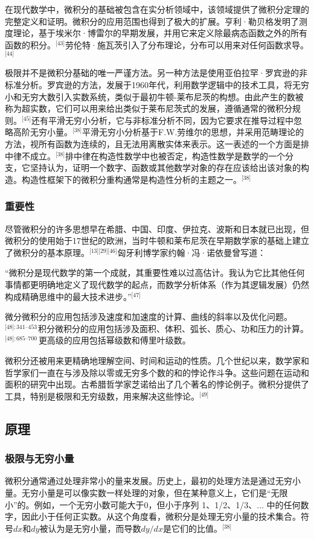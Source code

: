在现代数学中，微积分的基础被包含在实分析领域中，该领域提供了微积分定理的完整定义和证明。微积分的应用范围也得到了极大的扩展。亨利·勒贝格发明了测度理论，基于埃米尔·博雷尔的早期发展，并用它来定义除最病态函数之外的所有函数的积分。\(^\text{[43]}\)劳伦特·施瓦茨引入了分布理论，分布可以用来对任何函数求导。\(^\text{[44]}\)

极限并不是微积分基础的唯一严谨方法。另一种方法是使用亚伯拉罕·罗宾逊的非标准分析。罗宾逊的方法，发展于1960年代，利用数学逻辑中的技术工具，将无穷小和无穷大数引入实数系统，类似于最初牛顿-莱布尼茨的构想。由此产生的数被称为超实数，它们可以用来给出类似于莱布尼茨式的发展，遵循通常的微积分规则。\(^\text{[45]}\)还有平滑无穷小分析，它与非标准分析不同，因为它要求在推导过程中忽略高阶无穷小量。\(^\text{[38]}\)平滑无穷小分析基于F.W.劳维尔的思想，并采用范畴理论的方法，视所有函数为连续的，且无法用离散实体来表示。这一表述的一个方面是排中律不成立。\(^\text{[38]}\)排中律在构造性数学中也被否定，构造性数学是数学的一个分支，它坚持认为，证明一个数字、函数或其他数学对象的存在应该给出该对象的构造。构造性框架下的微积分重构通常是构造性分析的主题之一。\(^\text{[38]}\)
\subsubsection{重要性} 
尽管微积分的许多思想早在希腊、中国、印度、伊拉克、波斯和日本就已出现，但微积分的使用始于17世纪的欧洲，当时牛顿和莱布尼茨在早期数学家的基础上建立了微积分的基本原理。\(^\text{[13][29][46]}\)匈牙利博学家约翰·冯·诺依曼曾写道：

“微积分是现代数学的第一个成就，其重要性难以过高估计。我认为它比其他任何事情都更明确地定义了现代数学的起点，而数学分析体系（作为其逻辑发展）仍然构成精确思维中的最大技术进步。”\(^\text{[47]}\)

微分微积分的应用包括涉及速度和加速度的计算、曲线的斜率以及优化问题。\(^\text{[48]: 341–453}\) 积分微积分的应用包括涉及面积、体积、弧长、质心、功和压力的计算。\(^\text{[48]: 685–700 }\) 更高级的应用包括幂级数和傅里叶级数。

微积分还被用来更精确地理解空间、时间和运动的性质。几个世纪以来，数学家和哲学家们一直在与涉及除以零或无穷多个数的和的悖论作斗争。这些问题在运动和面积的研究中出现。古希腊哲学家芝诺给出了几个著名的悖论例子。微积分提供了工具，特别是极限和无穷级数，用来解决这些悖论。\(^\text{[49]}\)
\subsection{原理}  
\subsubsection{极限与无穷小量}   
微积分通常通过处理非常小的量来发展。历史上，最初的处理方法是通过无穷小量。无穷小量是可以像实数一样处理的对象，但在某种意义上，它们是“无限小”的。例如，一个无穷小数可能大于0，但小于序列 1、1/2、1/3、... 中的任何数字，因此小于任何正实数。从这个角度看，微积分是处理无穷小量的技术集合。符号\(dx\)和\(dy\)被认为是无穷小量，而导数\(dy/dx\)是它们的比值。\(^\text{[38]}\)

